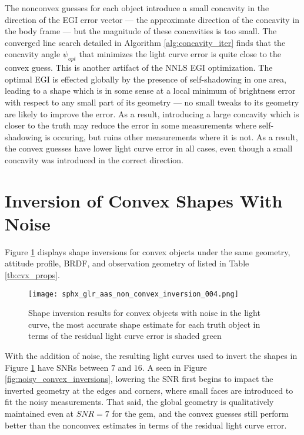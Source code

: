 The nonconvex guesses for each object introduce a small concavity in the direction of the EGI error vector --- the approximate direction of the concavity in the body frame --- but the magnitude of these concavities is too small. The converged line search detailed in Algorithm \ref{alg:concavity_iter} finds that the concavity angle $\psi_{opt}$ that minimizes the light curve error is quite close to the convex guess. This is another artifact of the NNLS EGI optimization. The optimal EGI is effected globally by the presence of self-shadowing in one area, leading to a shape which is in some sense at a local minimum of brightness error with respect to any small part of its geometry --- no small tweaks to its geometry are likely to improve the error. As a result, introducing a large concavity which is closer to the truth may reduce the error in some measurements where self-shadowing is occuring, but ruins other measurements where it is not. As a result, the convex guesses have lower light curve error in all cases, even though a small concavity was introduced in the correct direction.

\clearpage
\section{Inversion of Convex Shapes With Noise}

Figure \ref{fig:res_convex_with_noise} displays shape inversions for convex objects under the same geometry, attitude profile, BRDF, and observation geometry of listed in Table \ref{tb:cvx_props}.

\begin{figure}[!htb]
  \centering
  \texttt{[image: sphx\_glr\_aas\_non\_convex\_inversion\_004.png]}
  \caption{Shape inversion results for convex objects with noise in the light curve, the most accurate shape estimate for each truth object in terms of the residual light curve error is shaded green}
  \label{fig:res_convex_with_noise}
\end{figure}

With the addition of noise, the resulting light curves used to invert the shapes in Figure \ref{fig:res_convex_with_noise} have SNRs between $7$ and $16$. A seen in Figure \ref{fig:noisy_convex_inversions}, lowering the SNR first begins to impact the inverted geometry at the edges and corners, where small faces are introduced to fit the noisy measurements. That said, the global geometry is qualitatively maintained even at $SNR=7$ for the gem, and the convex guesses still perform better than the nonconvex estimates in terms of the residual light curve error.


